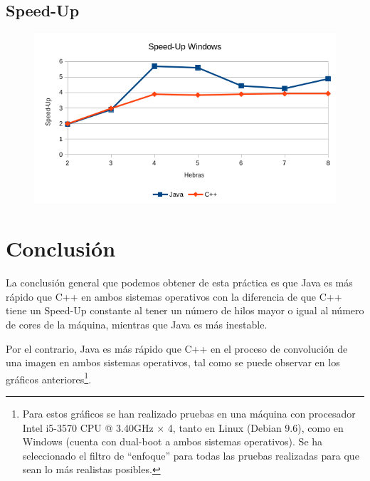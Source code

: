 \documentclass[12pt,letterpaper]{article}
\begin{document}
\subsection{Speed-Up}
\begin{figure}[h]
	\centering
	\includegraphics[scale=0.8]{SpeedUpWindows.png}
\end{figure}

\section{Conclusión}
La conclusión general que podemos obtener de esta práctica es que Java es más rápido que C++ en ambos sistemas operativos con la diferencia de que C++ tiene un Speed-Up constante al tener un número de hilos mayor o igual al número de cores de la máquina, mientras que Java es más inestable.

Por el contrario, Java es más rápido que C++ en el proceso de convolución de una imagen en ambos sistemas operativos, tal como se puede observar en los gráficos anteriores\footnote{Para estos gráficos se han realizado pruebas en una máquina con procesador Intel i5-3570 CPU @ 3.40GHz × 4, tanto en Linux (Debian 9.6), como en Windows (cuenta con dual-boot a ambos sistemas operativos). Se ha seleccionado el filtro de ``enfoque'' para todas las pruebas realizadas para que sean lo más realistas posibles.}.
\end{document}
